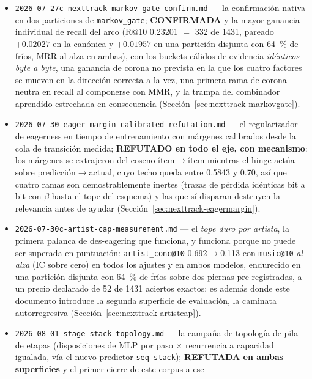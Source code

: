 \documentclass[11pt]{article}
\begin{document}
\begin{itemize}
    (Sección~\ref{sec:nexttrack-memo}).
  \item \texttt{2026-07-27c-nexttrack-markov-gate-confirm.md} --- la confirmación
    nativa en dos particiones de \texttt{markov\_gate}; \textbf{CONFIRMADA} y la
    mayor ganancia individual de recall del arco (R@10 \num{0.23201} $=$ \num{332}
    de \num{1431}, pareado $+\num{0.02027}$ en la canónica y $+\num{0.01957}$ en
    una partición disjunta con \SI{64}{\percent} de fríos, MRR al alza en ambas),
    con los buckets cálidos de evidencia \emph{idénticos byte a byte}, una ganancia
    de corona no prevista en la que los cuatro factores se mueven en la dirección
    correcta a la vez, una primera rama de corona neutra en recall al componerse con
    MMR, y la trampa del combinador aprendido estrechada en consecuencia
    (Sección~\ref{sec:nexttrack-markovgate}).
  \item \texttt{2026-07-30-eager-margin-calibrated-refutation.md} --- el
    regularizador de eagerness en tiempo de entrenamiento con márgenes calibrados
    desde la cola de transición medida; \textbf{REFUTADO en todo el eje, con
    mecanismo}: los márgenes se extrajeron del coseno ítem$\to$ítem mientras el
    hinge actúa sobre predicción$\to$actual, cuyo techo queda entre \num{0.5843} y
    \num{0.70}, así que cuatro ramas son demostrablemente inertes (trazas de pérdida
    idénticas bit a bit con $\beta$ hasta el tope del esquema) y las que sí disparan
    destruyen la relevancia antes de ayudar (Sección~\ref{sec:nexttrack-eagermargin}).
  \item \texttt{2026-07-30c-artist-cap-measurement.md} --- el \emph{tope duro por
    artista}, la primera palanca de des-eagering que funciona, y funciona porque no
    puede ser superada en puntuación: \texttt{artist\_conc@10}
    \num{0.692}$\to$\num{0.113} con \texttt{music@10} \emph{al alza} (IC sobre
    cero) en todos los ajustes y en ambos modelos, endurecido en una partición
    disjunta con \SI{64}{\percent} de fríos sobre dos piernas pre-registradas, a un
    precio declarado de \num{52} de \num{1431} aciertos exactos; es además donde
    este documento introduce la segunda superficie de evaluación, la caminata
    autorregresiva (Sección~\ref{sec:nexttrack-artistcap}).
  \item \texttt{2026-08-01-stage-stack-topology.md} --- la campaña de topología de
    pila de etapas (disposiciones de MLP por paso $\times$ recurrencia a capacidad
    igualada, vía el nuevo predictor \texttt{seq-stack});
    \textbf{REFUTADA en ambas superficies} y el primer cierre de este corpus a ese

\end{itemize}
\end{document}
